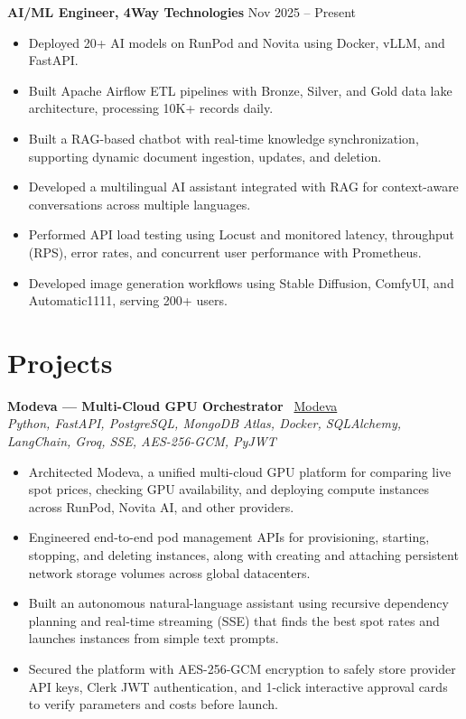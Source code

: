\documentclass[a4paper,10pt]{article}
\begin{document}
\textbf{AI/ML Engineer, 4Way Technologies} \hfill Nov 2025 -- Present
\begin{itemize}[leftmargin=*]

\item Deployed 20+ AI models on RunPod and Novita using Docker, vLLM, and FastAPI.

\item Built Apache Airflow ETL pipelines with Bronze, Silver, and Gold data lake architecture, processing 10K+ records daily.

\item Built a RAG-based chatbot with real-time knowledge synchronization, supporting dynamic document ingestion, updates, and deletion.

\item Developed a multilingual AI assistant integrated with RAG for context-aware conversations across multiple languages.

\item Performed API load testing using Locust and monitored latency, throughput (RPS), error rates, and concurrent user performance with Prometheus.

\item Developed image generation workflows using Stable Diffusion, ComfyUI, and Automatic1111, serving 200+ users.

\end{itemize}
 
\section*{Projects}

\textbf{Modeva — Multi-Cloud GPU Orchestrator} \hfill
\faGlobe\ \href{https://modeva.up.railway.app//}{Modeva}
\\[-2pt]
\textit{Python, FastAPI, PostgreSQL, MongoDB Atlas, Docker, SQLAlchemy, LangChain, Groq, SSE, AES-256-GCM, PyJWT}
\begin{itemize}[leftmargin=*]

\item Architected Modeva, a unified multi-cloud GPU platform for comparing live spot prices, checking GPU availability, and deploying compute instances across RunPod, Novita AI, and other providers.

\item Engineered end-to-end pod management APIs for provisioning, starting, stopping, and deleting instances, along with creating and attaching persistent network storage volumes across global datacenters.

\item Built an autonomous natural-language assistant using recursive dependency planning and real-time streaming (SSE) that finds the best spot rates and launches instances from simple text prompts.

\item Secured the platform with AES-256-GCM encryption to safely store provider API keys, Clerk JWT authentication, and 1-click interactive approval cards to verify parameters and costs before launch.

\end{itemize}
\end{document}
